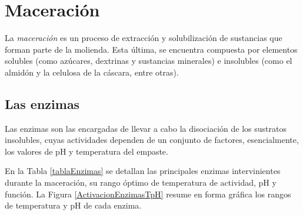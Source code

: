     \section{Maceración}
        \par La \textit{maceración} es un proceso de extracción y solubilización de sustancias que forman parte de la molienda. Esta última, se encuentra compuesta por elementos solubles (como azúcares, dextrinas y sustancias minerales) e insolubles (como el almidón y la celulosa de la cáscara, entre otras).
        
        \subsection{Las enzimas}
            \par Las enzimas son las encargadas de llevar a cabo la disociación de los sustratos insolubles, cuyas actividades dependen de un conjunto de factores, esencialmente, los valores de pH y temperatura del empaste. 
           
            \par En la Tabla \ref{tablaEnzimas} se detallan las principales enzimas intervinientes durante la maceración, su rango óptimo de temperatura de actividad, pH y función. La Figura \ref{ActivacionEnzimasTpH} resume en forma gráfica los rangos de temperatura y pH de cada enzima.
            
